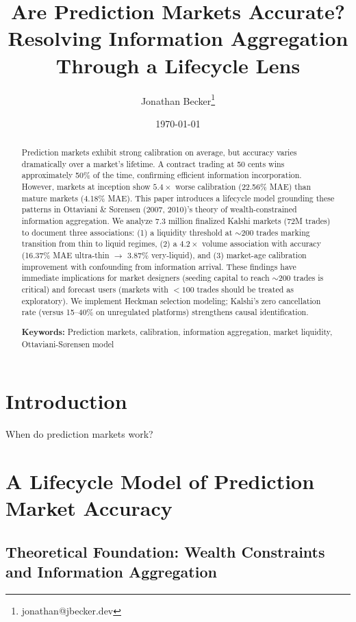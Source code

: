 \documentclass[a4paper,11pt]{article}
\title{\textbf{Are Prediction Markets Accurate? Resolving Information Aggregation Through a Lifecycle Lens}}
\author{Jonathan Becker\thanks{jonathan@jbecker.dev}}
\date{\today}
\theoremstyle{plain}
\theoremstyle{definition}
\begin{document}
\maketitle

\begin{abstract}
Prediction markets exhibit strong calibration on average, but accuracy varies dramatically over a market's lifetime. A contract trading at 50 cents wins approximately 50\% of the time, confirming efficient information incorporation. However, markets at inception show $5.4\times$ worse calibration (22.56\% MAE) than mature markets (4.18\% MAE). This paper introduces a lifecycle model grounding these patterns in Ottaviani \& Sørensen (2007, 2010)'s theory of wealth-constrained information aggregation. We analyze 7.3 million finalized Kalshi markets (72M trades) to document three associations: (1) a liquidity threshold at $\sim$200 trades marking transition from thin to liquid regimes, (2) a $4.2\times$ volume association with accuracy (16.37\% MAE ultra-thin $\to$ 3.87\% very-liquid), and (3) market-age calibration improvement with confounding from information arrival. These findings have immediate implications for market designers (seeding capital to reach $\sim$200 trades is critical) and forecast users (markets with $<100$ trades should be treated as exploratory). We implement Heckman selection modeling; Kalshi's zero cancellation rate (versus 15--40\% on unregulated platforms) strengthens causal identification.

\noindent\textbf{Keywords:} Prediction markets, calibration, information aggregation, market liquidity, Ottaviani-Sørensen model
\end{abstract}

\newpage
\tableofcontents
\newpage

\section{Introduction}
\label{sec:intro}

When do prediction markets work?

\section{A Lifecycle Model of Prediction Market Accuracy}
\label{sec:theory}

\subsection{Theoretical Foundation: Wealth Constraints and Information Aggregation}
\end{document}
